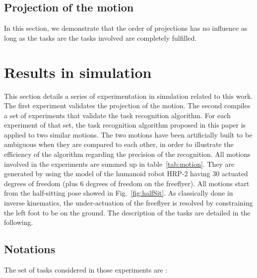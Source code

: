 \documentclass[letterpaper, 10pt, conference]{ieeeconf}      %
\begin{document}
\subsection{Projection of the motion}
In this section, we demonstrate that the order of projections
has no influence as long as the tasks are the tasks involved
are completely fulfilled.

\section{Results in simulation}
\label{sec:simu}
This section details a series of experimentation in simulation related to this work.
The first experiment validates the projection of the motion.
The second compiles a set of experiments that validate the task recognition algorithm. For each
experiment of that set, the task recognition algorithm proposed in this paper
is applied to two similar motions.
The two motions have been artificially built to be ambiguous when 
they are compared to each other, in order to illustrate the 
efficiency of the algorithm regarding the precision of the recognition.
All motions involved in the experiments are summed up in table~\ref{tab:motion}.
They are generated by using the model of the humanoid robot HRP-2 
having 30 actuated degrees of freedom (plus 6 degrees of freedom on the
freeflyer). All motions start from the half-sitting pose showed in Fig.~\ref{fig:halfSit}.
As classically done in inverse kinematics, the under-actuation of the freeflyer is resolved by constraining
the left foot to be on the ground. The description of the tasks are detailed in the following.

\subsection{Notations}
The set of tasks considered in those experiments are :
\end{document}
